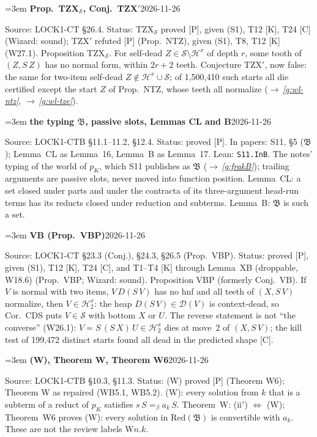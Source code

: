 \documentclass[11pt]{amsart}
\makeatletter
\newcommand{\conv}{=_\beta}
\newcommand{\Hc}{\mathcal H}
\newcommand{\Bk}{\mathfrak B}
\newcounter{sense}
\newenvironment{entry}[3]{%
  \par\addvspace{\medskipamount}\noindent\phantomsection
  \def\@currentlabel{#2}\label{#1}\setcounter{sense}{0}\raggedright\emergencystretch=3em%
  \textbf{#2}\hfill{\footnotesize\textsf{#3}}\par\nopagebreak\noindent\ignorespaces}%
  {\par}
\newcommand{\src}[1]{\textsf{Source:} #1.\enskip}
\newcommand{\lean}[1]{\textsf{Lean:} #1.\enskip}
\newcommand{\status}[1]{\textsf{Status:} #1.\enskip}
\newcommand{\appears}[1]{\textsf{In papers:} #1.\enskip}
\renewcommand{\see}[1]{$\rightarrow$\,\emph{\ref{#1}}}
\makeatother
\begin{document}
\begin{entry}{g:wl-tzx}{Prop.~TZX$_{\mathcal S}$, Conj.~TZX$'$}{2026-11-26}
\src{LOCK1-CT \S26.4}
\status{TZX$_{\mathcal S}$ proved [P], given (S1), T12 [K], T24 [C] (Wizard: sound); TZX$'$ refuted
[P] (Prop.~NTZ), given (S1), T8, T12 [K] (W27.1)}
Proposition TZX$_{\mathcal S}$. For self-dead $Z\in\mathcal S\setminus\Hc^{x}$ of depth $r$, some tooth of
$(Z,S\,Z)$ has no normal form, within $2r+2$ teeth. Conjecture TZX$'$, now false: the same for two-item
self-dead $Z\notin\Hc^{x}\cup\mathcal S$; of 1,500,410 such starts all die certified except the start
$Z$ of Prop.~NTZ, whose teeth all normalize (\see{g:wl-ntz}, \see{g:wl-tze}).
\end{entry}

\begin{entry}{g:wl-frakB}{the typing $\Bk$, passive slots, Lemmas CL and B}{2026-11-26}
\src{LOCK1-CTB \S11.1--11.2, \S12.4}
\status{proved [P]}
\appears{S11, \S5 ($\Bk$); Lemma~CL as Lemma~16, Lemma~B as Lemma~17}
\lean{\texttt{S11.InB}}
The notes' typing of the world of $p_K$, which S11 publishes as $\Bk$ (\see{g:frakB}); trailing
arguments are passive slots, never moved into function position. Lemma~CL: a set closed under parts
and under the contracta of its three-argument head-run terms has its reducts closed under reduction
and subterms. Lemma~B: $\Bk$ is such a set.
\end{entry}

\begin{entry}{g:wl-vb}{VB (Prop.~VBP)}{2026-11-26}
\src{LOCK1-CT \S23.3 (Conj.), \S24.3, \S26.5 (Prop.~VBP)}
\status{proved [P], given (S1), T12 [K], T24 [C], and T1--T4 [K] through Lemma~XB (droppable, W18.6)
(Prop.~VBP; Wizard: sound)}
Proposition VBP (formerly Conj.~VB). If $V$ is normal with two items, $V\,D(S\,V)$ has no hnf and all
teeth of $(X,S\,V)$ normalize, then $V\in\Hc^{x}_2$: the heap $D(S\,V)\in\mathcal D(V)$ is
context-dead, so Cor.~CDS puts $V\in\mathcal S$ with bottom $X$ or $U$. The reverse statement is not
``the converse'' (W26.1): $V=S\,(S\,X)\,U\in\Hc^{x}_2$ dies at move~2 of $(X,S\,V)$; the kill test of 199,472
distinct starts found all dead in the predicted shape [C].
\end{entry}

\begin{entry}{g:wl-w}{(W), Theorem W, Theorem W6}{2026-11-26}
\src{LOCK1-CTB \S10.3, \S11.3}
\status{(W) proved [P] (Theorem W6); Theorem W as repaired (WB5.1, WB5.2)}
(W): every solution from $k$ that is a subterm of a reduct of $p_K$ satisfies $s\,S\conv a_k\,S$.
Theorem~W: (ii$'$) $\Leftrightarrow$ (W); Theorem~W6 proves (W): every solution in $\mathrm{Red}(\Bk)$ is
convertible with $a_k$. These are not the review labels W$n$.$k$.
\end{entry}
\end{document}

